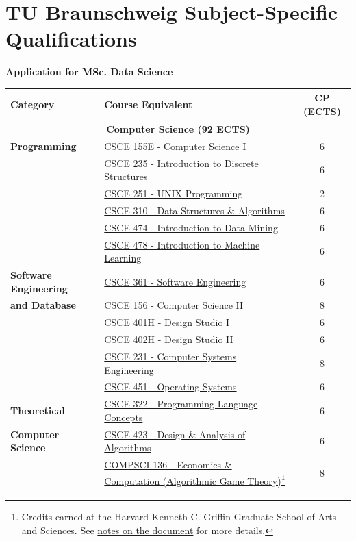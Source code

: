 \section*{TU Braunschweig Subject-Specific Qualifications}

\noindent
\textbf{Application for MSc. Data Science}

\begin{longtable}{p{5cm} p{8cm} c}
\toprule
\textbf{Category} & \textbf{Course Equivalent} & \textbf{CP (ECTS)} \\
\midrule
\multicolumn{3}{c}{\textbf{ Computer Science (92 ECTS)} } \\
\midrule

\textbf{Programming} 
& \hyperref[cs155]{CSCE 155E - Computer Science I} & 6 \\
& \hyperref[cs235]{CSCE 235 - Introduction to Discrete Structures} & 6 \\
& \hyperref[cs251]{CSCE 251 - UNIX Programming} & 2 \\
& \hyperref[cs301]{CSCE 310 - Data Structures \& Algorithms} & 6 \\
& \hyperref[cs474]{CSCE 474 - Introduction to Data Mining} & 6 \\
& \hyperref[cs478]{CSCE 478 - Introduction to Machine Learning} & 6 \\

\midrule

\textbf{Software Engineering}
& \hyperref[cs361]{CSCE 361 - Software Engineering} & 6 \\
\textbf{and Database}
& \hyperref[cs156]{CSCE 156 - Computer Science II} & 8 \\
& \hyperref[cs401]{CSCE 401H - Design Studio I} & 6 \\
& \hyperref[cs402]{CSCE 402H - Design Studio II} & 6 \\
& \hyperref[cs231]{CSCE 231 - Computer Systems Engineering} & 8 \\
& \hyperref[cs451]{CSCE 451 - Operating Systems} & 6 \\

\midrule

\textbf{Theoretical} 
& \hyperref[cs322]{CSCE 322 - Programming Language Concepts} & 6 \\
\textbf{Computer Science}
& \hyperref[cs423]{CSCE 423 - Design \& Analysis of Algorithms} & 6 \\
& \hyperref[cs136]{COMPSCI 136 - Economics \& Computation (Algorithmic Game Theory)}\footnote{Credits earned at the Harvard Kenneth C. Griffin Graduate School of Arts and Sciences. See \hyperref[sec: notes on document]{notes on the document} for more details.} & 8 \\



\end{longtable}
